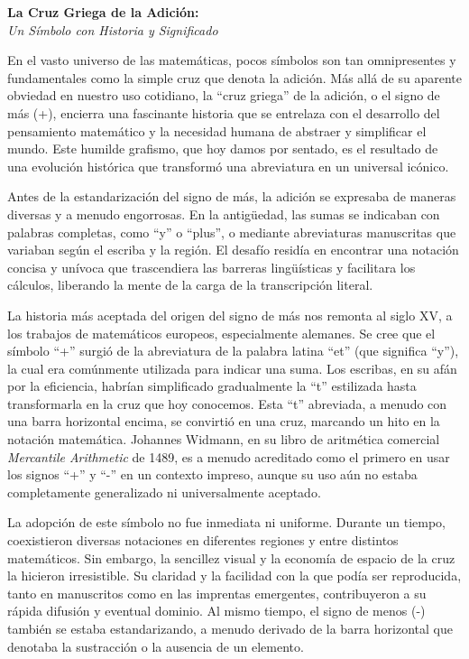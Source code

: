 \documentclass[11pt, a4paper]{article}
\newcommand{\ensayoTitulo}[2]{%
  \begin{center}
    \vspace*{1cm}
    {\fontsize{24}{26}\selectfont\textbf{#1}} \\
    \vspace{0.3cm}
    {\fontsize{16}{18}\selectfont\textit{#2}}
    \vspace*{1.5cm}
  \end{center}
}
\begin{document}
\ensayoTitulo{La Cruz Griega de la Adición:}{Un Símbolo con Historia y Significado}

En el vasto universo de las matemáticas, pocos símbolos son tan omnipresentes y fundamentales como la simple cruz que denota la adición. Más allá de su aparente obviedad en nuestro uso cotidiano, la ``cruz griega'' de la adición, o el signo de más (+), encierra una fascinante historia que se entrelaza con el desarrollo del pensamiento matemático y la necesidad humana de abstraer y simplificar el mundo. Este humilde grafismo, que hoy damos por sentado, es el resultado de una evolución histórica que transformó una abreviatura en un universal icónico.

Antes de la estandarización del signo de más, la adición se expresaba de maneras diversas y a menudo engorrosas. En la antigüedad, las sumas se indicaban con palabras completas, como ``y'' o ``plus'', o mediante abreviaturas manuscritas que variaban según el escriba y la región. El desafío residía en encontrar una notación concisa y unívoca que trascendiera las barreras lingüísticas y facilitara los cálculos, liberando la mente de la carga de la transcripción literal.

La historia más aceptada del origen del signo de más nos remonta al siglo XV, a los trabajos de matemáticos europeos, especialmente alemanes. Se cree que el símbolo ``+'' surgió de la abreviatura de la palabra latina ``et'' (que significa ``y''), la cual era comúnmente utilizada para indicar una suma. Los escribas, en su afán por la eficiencia, habrían simplificado gradualmente la ``t'' estilizada hasta transformarla en la cruz que hoy conocemos. Esta ``t'' abreviada, a menudo con una barra horizontal encima, se convirtió en una cruz, marcando un hito en la notación matemática. Johannes Widmann, en su libro de aritmética comercial \textit{Mercantile Arithmetic} de 1489, es a menudo acreditado como el primero en usar los signos ``+'' y ``-'' en un contexto impreso, aunque su uso aún no estaba completamente generalizado ni universalmente aceptado.

La adopción de este símbolo no fue inmediata ni uniforme. Durante un tiempo, coexistieron diversas notaciones en diferentes regiones y entre distintos matemáticos. Sin embargo, la sencillez visual y la economía de espacio de la cruz la hicieron irresistible. Su claridad y la facilidad con la que podía ser reproducida, tanto en manuscritos como en las imprentas emergentes, contribuyeron a su rápida difusión y eventual dominio. Al mismo tiempo, el signo de menos (-) también se estaba estandarizando, a menudo derivado de la barra horizontal que denotaba la sustracción o la ausencia de un elemento.
\end{document}
